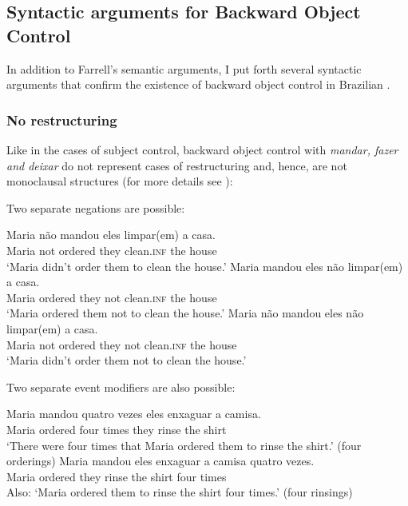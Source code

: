 \documentclass[output=paper]{langsci/langscibook}
\begin{document}
\z

\subsection{Syntactic arguments for Backward Object Control} %

In addition to Farrell’s semantic arguments, I put forth several syntactic arguments that confirm the existence of backward object control in Brazilian .

\subsubsection{No restructuring}%

Like in the cases of subject control, backward object control with \textit{mandar, fazer and deixar}\textbf{ }do not represent cases of restructuring and, hence, are not monoclausal structures (for more details see \citealt{Cyrino2010}):

Two separate negations are possible:

\ea%
    \label{ex:moreno:14}
    \ea
    \gll Maria não   mandou   eles limpar(em)   a casa.\\
         Maria not   ordered   they clean.\textsc{inf}   the house\\
    \glt ‘Maria didn’t order them to clean the house.’
    \ex  
    \gll Maria mandou   eles não   limpar(em)   a casa.\\
         Maria ordered   they not   clean.\textsc{inf}   the house\\
    \glt ‘Maria ordered them not  to clean  the house.’
    \ex  
    \gll Maria não   mandou   eles não limpar(em)   a casa.\\
         Maria  not   ordered   they not clean.\textsc{inf}   the house\\
    \glt ‘Maria didn’t order them not to clean the house.’
    \z
\z

Two separate event modifiers are also possible:

\ea%
    \label{ex:moreno:15}
    \ea
    \gll Maria mandou   quatro vezes  eles enxaguar   a camisa.\\
         Maria ordered    four    times  they rinse   the shirt\\
    \glt ‘There were four times that Maria ordered them to rinse the shirt.’ (four orderings)
    \ex  
    \gll Maria mandou eles   enxaguar   a camisa   quatro vezes.\\
         Maria ordered they   rinse     the shirt  four times\\
    \glt Also: ‘Maria ordered them to rinse the shirt four times.’ (four rinsings)
    \z
\z
\end{document}
